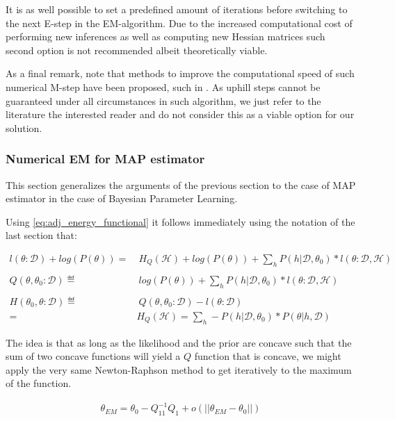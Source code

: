 \documentclass[11pt]{article}
\begin{document}
It is as well possible to set a predefined amount of iterations
before switching to the next E-step in the EM-algorithm. Due to the
increased computational cost of performing new inferences as well as
computing new Hessian matrices such second option is not
recommended albeit theoretically viable.

As a final remark, note that methods to improve the computational
speed of such numerical M-step have been proposed, such in
\cite{Louis_1982}. As uphill steps cannot be guaranteed under all
circumstances in such algorithm, we just refer to the literature the
interested reader and do not consider this as a viable option for
our solution.

\subsubsection{Numerical EM for MAP estimator}
\label{sec:org3ce0dfd}

This section generalizes the arguments of the previous section to
the case of MAP estimator in the case of Bayesian Parameter
Learning.

Using \ref{eq:adj_energy_functional} it follows immediately using the
notation of the last section that:

\begin{align} \label{eq:likelihood_energy_map_iterative}
l (\theta: \mathscr{D}) + log(P(\theta)) =& \ H_Q (\mathscr {H}) + log(P(\theta)) + \sum_h P(h | \mathscr{D}, \theta_0) * l (\theta: \mathscr{D}, \mathscr{H})\\
\nonumber\\
Q(\theta, \theta_0 : \mathscr{D}) \eqdef& \ log(P(\theta)) + \sum_h P(h | \mathscr{D}, \theta_0) * l (\theta: \mathscr{D}, \mathscr{H})\\
\nonumber\\  
H(\theta_0, \theta: \mathscr{D}) \eqdef& \ Q(\theta, \theta_0 : \mathscr{D}) - l (\theta: \mathscr{D}) \\
                                 =& H_Q (\mathscr {H}) = \sum_h - P(h | \mathscr{D}, \theta_0) * P(\theta | h, \mathscr{D}) \nonumber
\end{align}

The idea is that as long as the likelihood and the prior are
concave such that the sum of two concave functions will yield a \(Q\)
function that is concave, we might apply the very same
Newton-Raphson method to get iteratively to the maximum of the
function.

\begin{align} 
 \theta_{EM}  = \theta_{0} - Q_{11}^{-1} Q_1 + o(||\theta_{EM} - \theta_{0}||) \label{eq:em-iterative}
\end{align}
\end{document}
